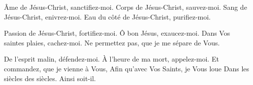 
Âme de Jésus-Christ, sanctifiez-moi. Corps de Jésus-Christ, sauvez-moi. Sang de Jésus-Christ, enivrez-moi. Eau du côté de Jésus-Christ, purifiez-moi. 

Passion de Jésus-Christ, fortifiez-moi. Ô bon Jésus, exaucez-moi. Dans Vos saintes plaies, cachez-moi. Ne permettez pas, que je me sépare de Vous. 

De l’esprit malin, défendez-moi. À l’heure de ma mort, appelez-moi. Et commandez, que je vienne à Vous, Afin qu’avec Vos Saints, je Vous loue Dans les siècles des siècles. Ainsi soit-il. 